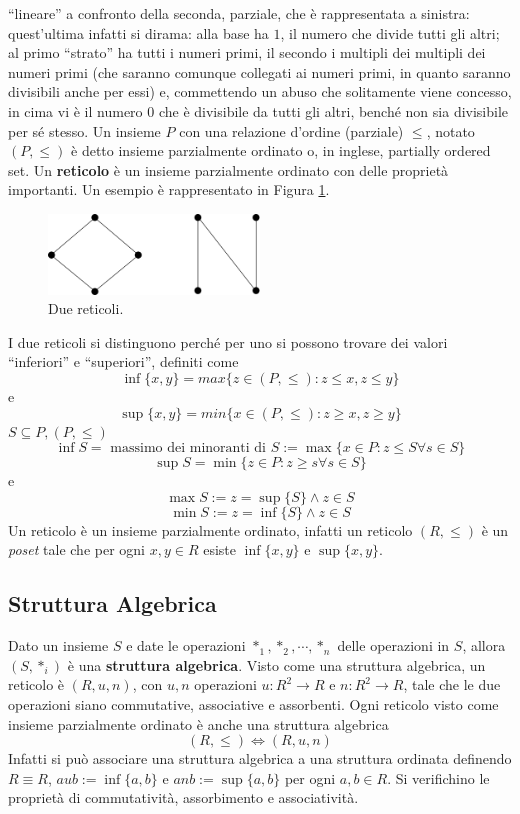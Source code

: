 ``lineare'' a confronto della seconda, parziale, che è rappresentata a 
sinistra: quest'ultima infatti si dirama: alla base ha $1$, il numero che 
divide tutti gli altri; al primo ``strato'' ha tutti i numeri primi, 
il secondo i multipli dei multipli dei numeri primi (che saranno comunque collegati 
ai numeri primi, in quanto saranno divisibili anche per essi) e, commettendo 
un abuso che solitamente viene concesso, in cima vi è il numero $0$ che è divisibile 
da tutti gli altri, benché non sia divisibile per sé stesso. 
Un insieme $P$ con una relazione d'ordine (parziale) $\leq$, 
notato $(P, \leq)$ è detto insieme parzialmente ordinato 
o, in inglese, partially ordered set. Un 
\textbf{reticolo} è un insieme parzialmente ordinato con 
delle proprietà importanti. Un esempio è 
rappresentato in Figura \ref{figure:reticolo}.
\begin{figure}[!h]
  \centering 
  \includegraphics[width=0.5\textwidth]{images/reticolo.png}
  \caption{Due reticoli.}
  \label{figure:reticolo}
\end{figure}
I due reticoli si distinguono perché per uno si possono trovare 
dei valori ``inferiori'' e ``superiori'', 
definiti come 
$$
\inf\{x,y\} = max \{z \in (P, \leq): z \leq x, z \leq y\}
$$
e 
$$
\sup\{x,y\} = min \{ x \in (P, \leq) : z \geq x, z \geq y \}
$$
$S \subseteq P, (P, \leq)$
$$
\inf S = \text{ massimo dei minoranti di } S := \max \{x \in P : z \leq S \forall s \in S \} 
$$ 
$$
\sup S = \min\{ z \in P : z \geq s \forall s \in S \} 
$$ 
e 
$$ 
\max S := z = \sup\{S\} \land z \in S
$$
$$
\min S := z = \inf\{S\} \land z \in S
$$
Un reticolo è un insieme parzialmente ordinato, infatti 
un reticolo $(R, \leq)$ è un \textit{poset} tale che 
per ogni $x, y \in R$ esiste $\inf\{x,y\}$ e $\sup\{x,y\}$. 

\subsection{Struttura Algebrica}
Dato un insieme $S$ e
date le operazioni $*_1, *_2, \cdots, *_n$ delle operazioni 
in $S$, allora $(S, *_i)$ è una \textbf{struttura algebrica}. 
Visto come una struttura algebrica, un reticolo 
è $(R, u, n)$, con $u, n$ operazioni 
$u: R^2 \rightarrow R$ e $ n: R^2 \rightarrow R$, tale che 
le due operazioni siano commutative, associative e 
assorbenti. Ogni reticolo visto come insieme parzialmente 
ordinato è anche una struttura algebrica 
$$
(R, \leq) \iff (R, u, n)
$$
Infatti si può associare una struttura algebrica 
a una struttura ordinata definendo $R\equiv R$, 
$a u b := \inf \{a,b\}$ e $a n b := \sup \{a,b\}$ 
per ogni $a,b \in R$. Si verifichino 
le proprietà di 
commutatività, assorbimento e associatività. 

